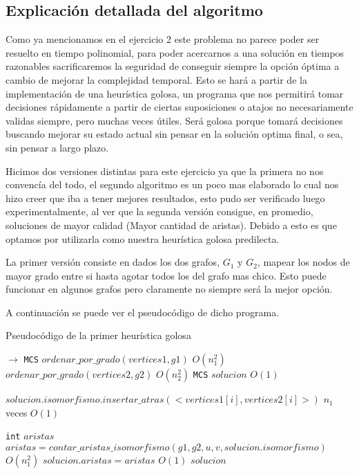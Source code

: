 \subsection{Explicación detallada del algoritmo}

Como ya mencionamos en el ejercicio 2 este problema no parece poder ser resuelto en tiempo polinomial, para poder acercarnos a una solución en tiempos razonables sacrificaremos la seguridad de conseguir siempre la opción óptima a cambio de mejorar la complejidad temporal. Esto se hará a partir de la implementación de una heurística golosa, un programa que nos permitirá tomar decisiones rápidamente a partir de ciertas suposiciones o atajos no necesariamente validas siempre, pero muchas veces
útiles. Será golosa porque tomará decisiones buscando mejorar su estado actual sin pensar en la solución optima final, o sea, sin pensar a largo plazo.

Hicimos dos versiones distintas para este ejercicio ya que la primera no nos convencía del todo, el segundo algoritmo es un poco mas elaborado lo cual nos hizo creer que iba a tener mejores resultados, esto pudo ser verificado luego experimentalmente, al ver que la segunda versión consigue, en promedio, soluciones de mayor calidad (Mayor cantidad de aristas). Debido a esto es que optamos por utilizarla como nuestra heurística golosa predilecta.

La primer versión consiste en dados los dos grafos, $G_1$ y $G_2$, mapear los nodos de mayor grado entre si hasta agotar todos los del grafo mas chico. Esto puede funcionar en algunos grafos pero claramente no siempre será la mejor opción. 

A continuación se puede ver el pseudocódigo de dicho programa.

\begin{algorithm}[H]
  \begin{algorithmic}[1]
  \caption{Pseudocódigo de la primer heurística golosa}
  \label{algo:4-1}
     $\to$ \texttt{MCS}
      \State $ordenar\_por\_grado(vertices1, g1)$ 
        \Comment $O(n_1^2)$ 
      \State $ordenar\_por\_grado(vertices2, g2)$ 
        \Comment $O(n_2^2)$ 
      \State \texttt{MCS} $solucion$ 
        \Comment $O(1)$ 

	  \State  $solucion.isomorfismo.insertar\_atras(<vertices1[i],vertices2[i]>)$
      \Comment $n_1$ veces $O(1)$
    	  \EndFor

	  \State \texttt{int} $aristas$
	  \State $ aristas = contar\_aristas\_isomorfismo(g1,g2,u,v, solucion.isomorfismo)$
      \Comment $O(n_1^2)$
	  \State $solucion.aristas = aristas$
	  \Comment $O(1)$
      \State \Return $solucion$
      \EndProcedure
	\end{algorithmic}
\end{algorithm}

